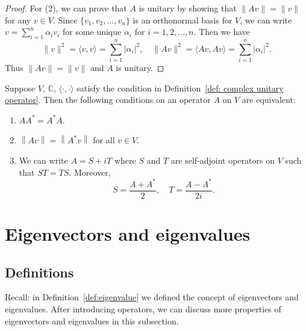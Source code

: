 \documentclass{ctexart}
\newcommand{\C}{\mathbb{C}}
\begin{document}
    \begin{proof}
        For (2), we can prove that $A$ is unitary by showing that $\| Av \| = \|v\|$ for any $v\in V$. Since $ \{v_1, v_2, \ldots, v_n\}$ is an orthonormal basis for $V$, we can write $v = \displaystyle \sum_{i=1}^n \alpha_i v_i$ for some unique $\alpha_i$ for $i=1,2,\ldots,n$. Then we have
        \[
        \| v \|^2 = \langle v, v \rangle = \sum_{i=1}^n |\alpha_i|^2, \quad \| Av \|^2 = \langle Av, Av \rangle = \sum_{i=1}^n |\alpha_i|^2.
        \]
        Thus $\| Av \| = \|v\|$ and $A$ is unitary.
    \end{proof}
    \begin{mycor}
        Suppose $V$, $\C$, $\langle \cdot, \cdot \rangle$ satisfy the condition in Definition~\ref{def: complex unitary operator}. Then the following conditions on an operator $A$ on $V$ are equivalent:
        \begin{enumerate}
            \item $AA^* = A^*A$.
            \item $\left\| Av\right\| = \left\| A^* v\right\|$ for all $v\in V$.
            \item We can write $A=S+iT$ where $S$ and $T$ are self-adjoint operators on $V$ such that $ST=TS$. Moreover,
            $$ S = \frac{A+A^*}{2}, \quad T = \frac{A-A^*}{2i}. $$
        \end{enumerate}
    \end{mycor}

    \newpage
    \section{Eigenvectors and eigenvalues}
    \subsection{Definitions}
    Recall: in Definition~\ref{def:eigenvalue} we defined the concept of eigenvectors and eigenvalues. After introducing operators, we can discuss more properties of eigenvectors and eigenvalues in this subsection.
    
\end{document}
